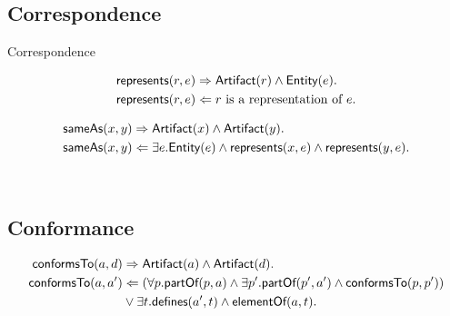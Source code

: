 \subsection{Correspondence}
\label{subsection:Correspondence}
\Gls{Correspondence} 

\begin{align*}
&\textsf{represents}(r,e)
\Rightarrow
\textsf{Artifact}(r) \wedge \textsf{Entity}(e).\\
&\textsf{represents}(r,e)
\Leftarrow
r \text{ is a representation of } e.
\end{align*}

\begin{align*}
&\textsf{sameAs}(x,y)
\Rightarrow
\textsf{Artifact}(x) \wedge \textsf{Artifact}(y).\\
&\textsf{sameAs}(x,y)
\Leftarrow
\exists e.\textsf{Entity}(e) \wedge \textsf{represents}(x,e) \wedge \textsf{represents}(y,e).
\end{align*}

\begin{axiom}[\correspondsTo]
~
\newline
{}
\end{axiom}


\subsection{Conformance}
\label{subsection:Conformance}

\begin{axiom}[\conformsTo]
\begin{align*}
\textsf{conformsTo}(a,d)
&\Rightarrow
\textsf{Artifact}(a) \wedge \textsf{Artifact}(d).\\
\textsf{conformsTo}(a,a')
&\Leftarrow
(\forall p.\textsf{partOf}(p,a) \wedge \exists p'.\textsf{partOf}(p',a') \wedge \textsf{conformsTo}(p,p'))\\
&\vee \exists t.\textsf{defines}(a',t) \wedge \textsf{elementOf}(a,t).
\end{align*}
\end{axiom}



